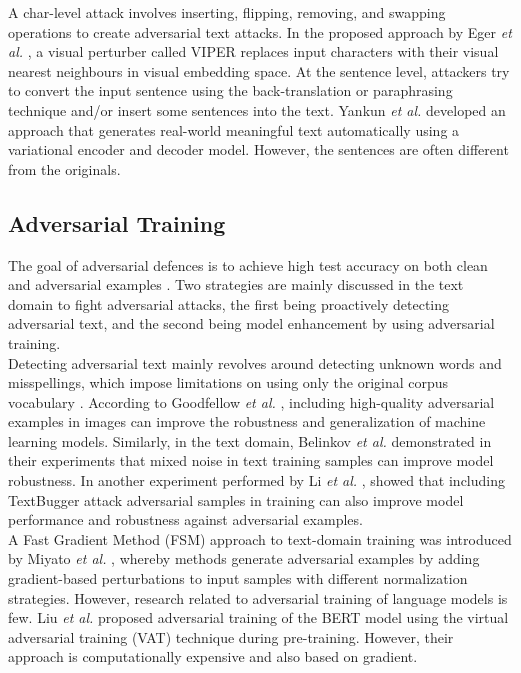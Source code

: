\documentclass[%
	BCOR=8mm, %
	DIV=12,
	toc=bibliography, %
	toc=listof, %
	oneside, %
	egregdoesnotlikesansseriftitles, %
	]{scrbook}
\begin{document}
A char-level attack involves inserting, flipping, removing, and swapping operations to create adversarial text attacks. In the proposed approach by Eger \textit{et al.} \cite{eger_text_2019}, a visual perturber called VIPER replaces input characters with their visual nearest neighbours in visual embedding space.
At the sentence level, attackers try to convert the input sentence using the back-translation or paraphrasing technique and/or  insert some sentences into the text. Yankun \textit{et al.} \cite{ren_generating_2020}  developed an approach that generates real-world meaningful text automatically using a variational encoder and decoder model. However, the sentences are often different from the originals.

\subsection{Adversarial Training}
\label{subsection: adversarialtraining}
The goal of adversarial defences is to achieve high test accuracy on both clean and adversarial examples \cite{zhou_defense_2020}. Two strategies are mainly discussed in the text domain to fight adversarial attacks, the first being proactively detecting adversarial text, and the second being model enhancement by using adversarial training.\\
 Detecting adversarial text mainly revolves around detecting unknown words and misspellings, which impose limitations on using only the original corpus vocabulary \cite{wang_towards_2021}. 
According to Goodfellow \textit{et al.} \cite{goodfellow_explaining_2015}, including high-quality adversarial examples in images can improve the robustness and generalization of machine learning models. Similarly, in the text domain, Belinkov \textit{et al.}  \cite{belinkov_synthetic_2018} demonstrated in their experiments that mixed noise in text training samples can improve model robustness. In another experiment performed by Li \textit{et al.} \cite{li_textbugger_2019}, showed that including TextBugger attack adversarial samples in training can also improve model performance and robustness against adversarial examples.\\
A Fast Gradient Method (FSM) approach to text-domain training was introduced by Miyato \textit{et al.} \cite{miyato_adversarial_2017}, whereby methods generate adversarial examples by adding gradient-based perturbations to input samples with different normalization strategies.
However, research related to adversarial training of language models is few. Liu \textit{et al.} \cite{liu_adversarial_2020} proposed adversarial training of the BERT model using the virtual adversarial training (VAT) technique \cite{miyato_virtual_2018}  during pre-training. However, their approach is computationally expensive and also based on gradient.\\
\end{document}
